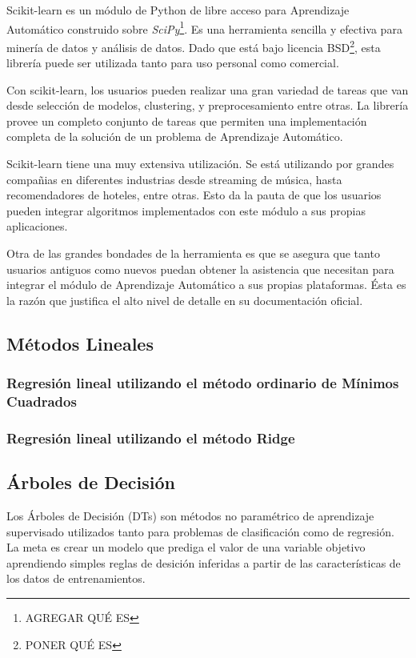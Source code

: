 Scikit-learn es un módulo de Python de libre acceso para Aprendizaje Automático
construido sobre \textit{SciPy}\footnote{AGREGAR QUÉ ES}. Es una herramienta
sencilla y efectiva para minería de datos y análisis de datos. Dado que está bajo
licencia BSD\footnote{PONER QUÉ ES}, esta librería puede ser utilizada tanto
para uso personal como comercial.

Con scikit-learn, los usuarios pueden realizar una gran variedad de tareas
que van desde selección de modelos, clustering, y preprocesamiento entre otras.
La librería provee un completo conjunto de tareas que permiten una
implementación completa de la solución de un problema
de Aprendizaje Automático.

Scikit-learn tiene una muy extensiva utilización. Se está utilizando por
grandes compañias en diferentes industrias desde streaming de música, hasta
recomendadores de hoteles, entre otras. Esto da la pauta de que los usuarios pueden
integrar algoritmos implementados con este módulo a sus propias aplicaciones.

Otra de las grandes bondades de la herramienta es que se asegura que tanto usuarios
antiguos como nuevos puedan obtener la asistencia que necesitan para integrar
el módulo de Aprendizaje Automático a sus propias plataformas. Ésta es la razón
que justifica el alto nivel de detalle en su documentación oficial.



\subsection{Métodos Lineales}

\subsubsection{Regresión lineal utilizando el método ordinario de Mínimos Cuadrados}

\subsubsection{Regresión lineal utilizando el método Ridge}


\subsection{Árboles de Decisión}
Los Árboles de Decisión (DTs) son métodos no paramétrico de aprendizaje supervisado
utilizados tanto para problemas de clasificación como de regresión.
La meta es crear un modelo que prediga el valor de una variable objetivo aprendiendo
simples reglas de desición inferidas a partir de las características de los datos
de entrenamientos.

